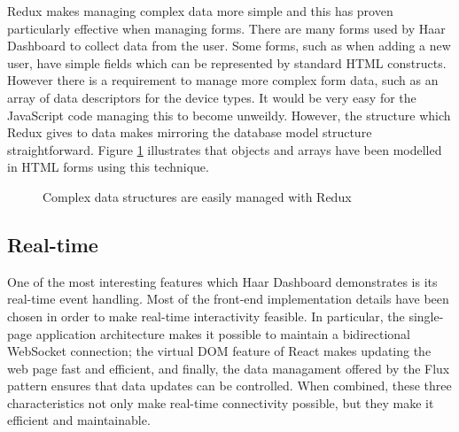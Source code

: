       Redux makes managing complex data more simple and this has proven particularly effective when managing forms. There are many forms used by Haar Dashboard to collect data from the user. Some forms, such as when adding a new user, have simple fields which can be represented by standard HTML constructs. However there is a requirement to manage more complex form data, such as an array of data descriptors for the device types. It would be very easy for the JavaScript code managing this to become unweildy. However, the structure which Redux gives to data makes mirroring the database model structure straightforward. Figure \ref{figure:form-array} illustrates that objects and arrays have been modelled in HTML forms using this technique.

      \begin{figure}
        \centering
        \caption{Complex data structures are easily managed with Redux}
        \label{figure:form-array}
      \end{figure}

    \subsection{Real-time}
      One of the most interesting features which Haar Dashboard demonstrates is its real-time event handling. Most of the front-end implementation details have been chosen in order to make real-time interactivity feasible. In particular, the single-page application architecture makes it possible to maintain a bidirectional WebSocket connection; the virtual DOM feature of React makes updating the web page fast and efficient, and finally, the data managament offered by the Flux pattern ensures that data updates can be controlled. When combined, these three characteristics not only make real-time connectivity possible, but they make it efficient and maintainable.

